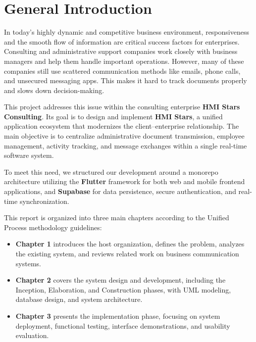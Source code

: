 \chapter*{General Introduction}
In today's highly dynamic and competitive business environment, responsiveness and the smooth flow of information are critical success factors for enterprises. Consulting and administrative support companies work closely with business managers and help them handle important operations. However, many of these companies still use scattered communication methods like emails, phone calls, and unsecured messaging apps. This makes it hard to track documents properly and slows down decision-making.

This project addresses this issue within the consulting enterprise \textbf{HMI Stars Consulting}.
Its goal is to design and implement \textbf{HMI Stars}, a unified application ecosystem that modernizes the client–enterprise relationship.
The main objective is to centralize administrative document transmission, employee management, activity tracking, and message exchanges within a single real-time software system.

To meet this need, we structured our development around a monorepo architecture utilizing the \textbf{Flutter} framework for both web and mobile frontend applications, and \textbf{Supabase} for data persistence, secure authentication, and real-time synchronization.

This report is organized into three main chapters according to the Unified Process methodology guidelines:
\begin{itemize}
\item \textbf{Chapter 1} introduces the host organization, defines the problem, analyzes the existing system, and reviews related work on business communication systems.

\item \textbf{Chapter 2} covers the system design and development, including the Inception, Elaboration, and Construction phases, with UML modeling, database design, and system architecture.

\item \textbf{Chapter 3} presents the implementation phase, focusing on system deployment, functional testing, interface demonstrations, and usability evaluation.

\end{itemize}

